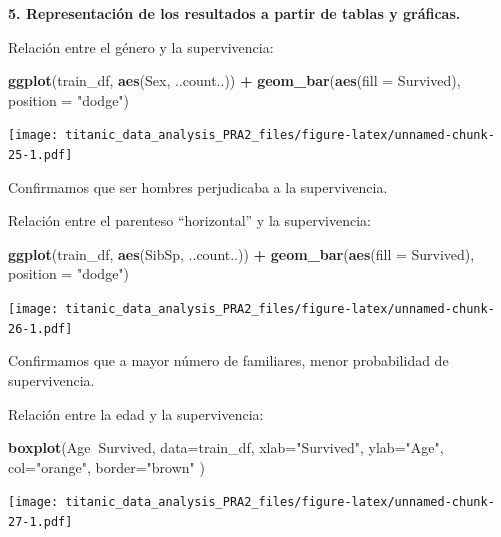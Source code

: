 \documentclass[]{article}
\newenvironment{Shaded}{\begin{snugshade}}{\end{snugshade}}
\newcommand{\DataTypeTok}[1]{\textcolor[rgb]{0.13,0.29,0.53}{#1}}
\newcommand{\KeywordTok}[1]{\textcolor[rgb]{0.13,0.29,0.53}{\textbf{#1}}}
\newcommand{\NormalTok}[1]{#1}
\newcommand{\OperatorTok}[1]{\textcolor[rgb]{0.81,0.36,0.00}{\textbf{#1}}}
\newcommand{\StringTok}[1]{\textcolor[rgb]{0.31,0.60,0.02}{#1}}
\begin{document}
\textbf{5. Representación de los resultados a partir de tablas y
gráficas.}

Relación entre el género y la supervivencia:

\begin{Shaded}
\begin{Highlighting}[]
\KeywordTok{ggplot}\NormalTok{(train_df, }\KeywordTok{aes}\NormalTok{(Sex, ..count..)) }\OperatorTok{+}\StringTok{ }\KeywordTok{geom_bar}\NormalTok{(}\KeywordTok{aes}\NormalTok{(}\DataTypeTok{fill =}\NormalTok{ Survived), }\DataTypeTok{position =} \StringTok{"dodge"}\NormalTok{)}
\end{Highlighting}
\end{Shaded}

\texttt{[image: titanic\_data\_analysis\_PRA2\_files/figure-latex/unnamed-chunk-25-1.pdf]}

Confirmamos que ser hombres perjudicaba a la supervivencia.

Relación entre el parenteso ``horizontal'' y la supervivencia:

\begin{Shaded}
\begin{Highlighting}[]
\KeywordTok{ggplot}\NormalTok{(train_df, }\KeywordTok{aes}\NormalTok{(SibSp, ..count..)) }\OperatorTok{+}\StringTok{ }\KeywordTok{geom_bar}\NormalTok{(}\KeywordTok{aes}\NormalTok{(}\DataTypeTok{fill =}\NormalTok{ Survived), }\DataTypeTok{position =} \StringTok{"dodge"}\NormalTok{)}
\end{Highlighting}
\end{Shaded}

\texttt{[image: titanic\_data\_analysis\_PRA2\_files/figure-latex/unnamed-chunk-26-1.pdf]}

Confirmamos que a mayor número de familiares, menor probabilidad de
supervivencia.

Relación entre la edad y la supervivencia:

\begin{Shaded}
\begin{Highlighting}[]
\KeywordTok{boxplot}\NormalTok{(Age}\OperatorTok{~}\NormalTok{Survived,}
\DataTypeTok{data=}\NormalTok{train_df,}
\DataTypeTok{xlab=}\StringTok{"Survived"}\NormalTok{,}
\DataTypeTok{ylab=}\StringTok{"Age"}\NormalTok{,}
\DataTypeTok{col=}\StringTok{"orange"}\NormalTok{,}
\DataTypeTok{border=}\StringTok{"brown"}
\NormalTok{)}
\end{Highlighting}
\end{Shaded}

\texttt{[image: titanic\_data\_analysis\_PRA2\_files/figure-latex/unnamed-chunk-27-1.pdf]}
\end{document}

